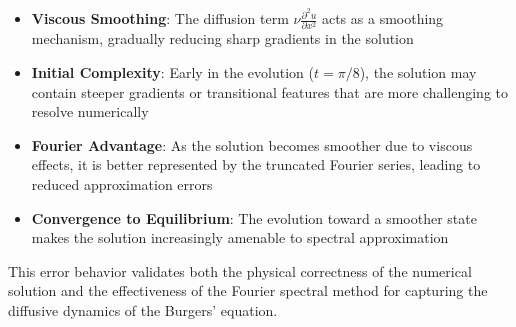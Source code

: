 \begin{itemize}
	\item \textbf{Viscous Smoothing}: The diffusion term $\nu\frac{\partial^2 u}{\partial x^2}$ acts as a smoothing mechanism, gradually reducing sharp gradients in the solution
	\item \textbf{Initial Complexity}: Early in the evolution ($t = \pi/8$), the solution may contain steeper gradients or transitional features that are more challenging to resolve numerically
	\item \textbf{Fourier Advantage}: As the solution becomes smoother due to viscous effects, it is better represented by the truncated Fourier series, leading to reduced approximation errors
	\item \textbf{Convergence to Equilibrium}: The evolution toward a smoother state makes the solution increasingly amenable to spectral approximation
\end{itemize}

This error behavior validates both the physical correctness of the numerical solution and the effectiveness of the Fourier spectral method for capturing the diffusive dynamics of the Burgers' equation.

